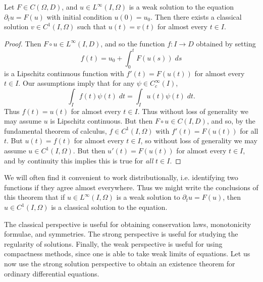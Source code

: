 \begin{lemma}
    Let $F \in C(\Omega,D)$, and $u \in L^\infty(I,\Omega)$ is a weak solution to the equation $\partial_t u = F(u)$ with initial condition $u(0) = u_0$. Then there exists a classical solution $v \in C^1(I,\Omega)$ such that $u(t) = v(t)$ for almost every $t \in I$.
\end{lemma}
\begin{proof}
    Then $F \circ u \in L^\infty(I,D)$, and so the function $f: I \to D$ obtained by setting
    \[ f(t) = u_0 + \int_0^t F(u(s))\; ds \]
    is a Lipschitz continuous function with $f'(t) = F(u(t))$ for almost every $t \in I$. Our assumptions imply that for any $\psi \in C_c^\infty(I)$,
    \[ \int_I f(t) \psi(t)\; dt = \int_I u(t) \psi(t)\; dt. \]
    Thus $f(t) = u(t)$ for almost every $t \in I$. Thus without loss of generality we may assume $u$ is Lipschitz continuous. But then $F \circ u \in C(I,D)$, and so, by the fundamental theorem of calculus, $f \in C^1(I,\Omega)$ with $f'(t) = F(u(t))$ for all $t$. But $u(t) = f(t)$ for almost every $t \in I$, so without loss of generality we may assume $u \in C^1(I,\Omega)$. But then $u'(t) = F(u(t))$ for almost every $t \in I$, and by continuity this implies this is true for \emph{all} $t \in I$.
\end{proof}

\begin{remark}
    We will often find it convenient to work distributionally, i.e. identifying two functions if they agree almost everywhere. Thus we might write the conclusions of this theorem that if $u \in L^\infty(I,\Omega)$ is a weak solution to $\partial_t u = F(u)$, then $u \in C^1(I,\Omega)$ is a classical solution to the equation.
\end{remark}

The classical perspective is useful for obtaining conservation laws, monotonicity formulae, and symmetries. The strong perspective is useful for studying the regularity of solutions. Finally, the weak perspective is useful for using compactness methods, since one is able to take weak limits of equations. Let us now use the strong solution perspective to obtain an existence theorem for ordinary differential equations.

